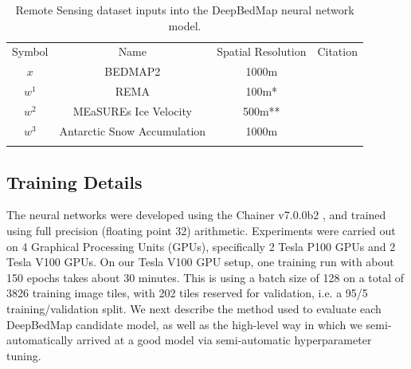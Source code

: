 \documentclass[tc, manuscript]{copernicus}
\begin{document}
\begin{table}[h]
\caption{Remote Sensing dataset inputs into the DeepBedMap neural network model.}
\label{table:datainputs}
\begin{tabular}{cccc}
\tophline
Symbol & Name & Spatial Resolution & Citation \\
\middlehline
$x$ & BEDMAP2 & 1000m & \cite{FretwellBedmap2improvedice2013} \\
$w^1$ & REMA & 100m* & \cite{HowatReferenceElevationModel2019} \\
$w^2$ & MEaSUREs Ice Velocity & 500m** & \cite{MouginotContinentwideinterferometric2019} \\
$w^3$ & Antarctic Snow Accumulation & 1000m & \cite{ArthernAntarcticsnowaccumulation2006} \\
\bottomhline
\end{tabular}
\end{table}

\subsection{Training Details}

The neural networks were developed using the Chainer v7.0.0b2 \citep{TokuiChainerDeepLearning2019}, and trained using full precision (floating point 32) arithmetic.
Experiments were carried out on 4 Graphical Processing Units (GPUs), specifically 2 Tesla P100 GPUs and 2 Tesla V100 GPUs.
On our Tesla V100 GPU setup, one training run with about 150 epochs takes about 30 minutes.
This is using a batch size of 128 on a total of 3826 training image tiles, with 202 tiles reserved for validation, i.e. a 95/5 training/validation split.
We next describe the method used to evaluate each DeepBedMap candidate model, as well as the high-level way in which we semi-automatically arrived at a good model via semi-automatic hyperparameter tuning.
\end{document}
